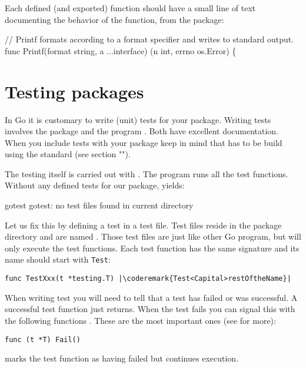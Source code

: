 Each defined (and exported) function should have a small line of text
documenting the behavior of the function, from the 
package:
\begin{display}
// Printf formats according to a format specifier and writes to standard output.
func Printf(format string, a ...interface{}) (n int, errno os.Error) \{
\end{display}

\section{Testing packages}
In Go it is customary to write (unit) tests for your package. Writing
tests involves the  package and the program
. Both
have excellent documentation. When you include tests with your package
keep in mind that has to be build using the standard 
(see section "").


The testing itself is carried out with .
The  program runs all the test functions. Without any
defined tests for our  package,  yields:
\begin{display}
\pr gotest
gotest: no test files found in current directory
\end{display}
Let us fix this by defining a test in a test file. Test files reside
in the package directory and are named . Those test
files are just like other Go program, but  will only
execute the test functions.
Each test function has the same signature and its name should start
with \lstinline{Test}:
\begin{lstlisting}
func TestXxx(t *testing.T) |\coderemark{Test<Capital>restOftheName}|
\end{lstlisting}

When writing test you will need to tell  that a test has
failed or was successful. A successful test function just returns. When
the test fails you can signal this with the following
functions \cite{go_doc}. These are the most important ones (see 
for more):

\begin{lstlisting}[numbers=none]
func (t *T) Fail()
\end{lstlisting}
 marks the test function as having failed but continues execution.

